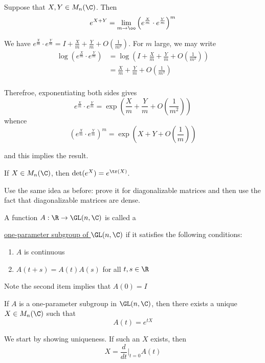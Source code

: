\documentclass[x11names,reqno,14pt]{extarticle}
\newcommand{\dd}[2]{\frac{d#1}{d#2}}
\begin{document}

Suppose that $X, Y \in M_n(\C)$. Then 
\[
e^{X + Y} = \lim_{m\to\oo}\left(e^{\frac{X}{m}}\cdot e^{\frac{Y}{m}}\right)^m
\]

\proof

We have $e^{\frac{X}{m}}\cdot e^{\frac{Y}{m}} = I + \frac{X}{m} + \frac{Y}{m} + O(\frac{1}{m^2})$. For $m$ large, we may write
\begin{align*}
\log(e^{\frac{X}{m}}\cdot e^{\frac{Y}{m}}) &  = \log(I + \frac{X}{m} + \frac{Y}{m} + O(\frac{1}{m^2})) \\
& = \frac{X}{m} + \frac{Y}{m} + O(\frac{1}{m^2}) \\
\end{align*}

Therefroe, exponentiating both sides gives
\[
e^{\frac{X}{m}}\cdot e^{\frac{Y}{m}} = \exp(\frac{X}{m} + \frac{Y}{m} + O(\frac{1}{m^2}))
\]
whence
\[
(e^{\frac{X}{m}}\cdot e^{\frac{Y}{m}})^m = \exp(X + Y + O(\frac{1}{m}))
\]

and this implies the result. 

\thm

If $X \in M_n(\C)$, then $\det(e^X) = e^{\tr(X)}$. 

\proof

Use the same idea as before: prove it for diagonalizable matrices and then use the fact that diagonalizable matrices are dense. 


A function $A:\R\to\GL(n,\C)$ is called a 

\underline{one-parameter subgroup of $\GL(n,\C)$} if it satisfies the following conditions:
\begin{enumerate}

\item $A$ is continuous

\item $A(t + s) = A(t)A(s)$ for all $t, s \in \R$

\end{enumerate}

Note the second item implies that $A(0) = I$

\thm

If $A$ is a one-parameter subgroup in $\GL(n,\C)$, then there exists a unique $X\in M_n(\C)$ such that 
\[
A(t) = e^{tX}
\]

\proof

We start by showing uniqueness. If such an $X$ exists, then 
\[
X = \dd{}{t}|_{t=0}A(t)
\]
\end{document}
